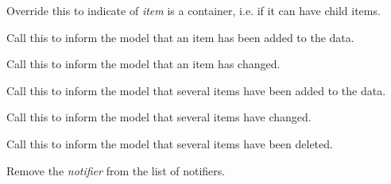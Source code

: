 \label{wxdataviewmodeliscontainer}


Override this to indicate of {\it item} is a container, i.e. if
it can have child items.

\label{wxdataviewmodelitemadded}


Call this to inform the model that an item has been added
to the data.

\label{wxdataviewmodelitemchanged}


Call this to inform the model that an item has changed.

\label{wxdataviewmodelitemsadded}


Call this to inform the model that several items have been added
to the data.

\label{wxdataviewmodelitemschanged}


Call this to inform the model that several items have changed.

\label{wxdataviewmodelitemsdeleted}


Call this to inform the model that several items have been deleted.

\label{wxdataviewmodelremovenotifier}


Remove the {\it notifier} from the list of notifiers.

\label{wxdataviewmodelresort}


